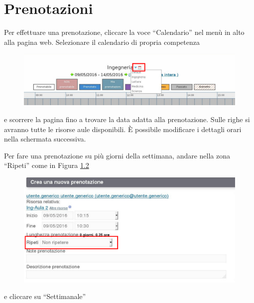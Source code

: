 \chapter{Prenotazioni}
Per effettuare una prenotazione, cliccare la voce ``Calendario'' nel menù in alto alla pagina web.
Selezionare il calendario di propria competenza
\begin{figure}[H]
\centering{}\includegraphics[scale=0.5]{Immagini/calendari_selezione.pdf}
\normalsize
\caption{}
\label{fig:calendari_selezione.pdf}
\end{figure}

e scorrere la pagina fino a trovare la data adatta alla prenotazione. Sulle righe
si avranno tutte le risorse aule disponibili. È possibile modificare i dettagli orari nella schermata
successiva.

Per fare una prenotazione su più giorni della settimana, andare nella zona ``Ripeti'' come in Figura
\ref{fig:prenotazione_ripetizione_1.pdf}

\begin{figure}[H]
\centering{}\includegraphics[scale=0.5]{Immagini/prenotazione_ripetizione_1.pdf}
\normalsize
\caption{}
\label{fig:prenotazione_ripetizione_1.pdf}
\end{figure}

e cliccare su ``Settimanale''

